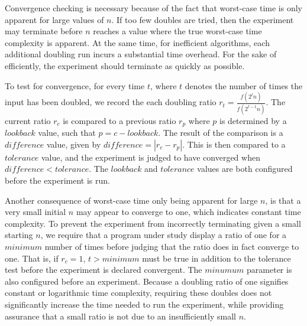   Convergence checking is necessary because of the fact that worst-case time is only apparent for large values of $n$.
  If too few doubles are tried, then the experiment may terminate before $n$ reaches a value where the true worst-case
  time complexity is apparent. At the same time, for inefficient  algorithms, each additional doubling run incurs a
  substantial time overhead. For the sake of efficiently, the experiment should terminate as quickly as possible.


  To test for convergence, for every time $t$, where $t$ denotes the number of times the input has been doubled, we
  record the each doubling ratio $r_t = \frac{f(2^t n)}{f(2^{t-1}n)}$. The current ratio $r_c$ is compared to a previous
  ratio $r_p$ where $p$ is determined by a $\mathit{lookback}$ value, such that $p=c-\mathit{lookback}$.  The result of
  the comparison is a $\mathit{difference}$ value, given by $\mathit{difference} = |r_c - r_p|$.  This is then compared
  to a $\mathit{tolerance}$ value, and the experiment is judged to have converged when $\mathit{difference}<\mathit{tolerance}$.
  The $\mathit{lookback}$ and $\mathit{tolerance}$ values are both configured before the experiment is run.

  Another consequence of worst-case time only being apparent for large $n$, is that a very small initial $n$ may appear
  to converge to one, which indicates constant time complexity. To prevent the experiment from incorrectly terminating given a
  small starting $n$, we require that a program under study display a ratio of one for a $\mathit{minimum}$ number of
  times before judging that the ratio does in fact converge to one.  That is, if $r_c = 1$, $t > \mathit{minimum}$ must
  be true in addition to the tolerance test before the experiment is declared convergent.  The $\mathit{minumum}$
  parameter is also configured before an experiment.  Because a doubling ratio of one signifies constant or logarithmic
  time complexity, requiring these doubles does not significantly increase the time needed to run the experiment, while
  providing assurance that a small ratio is not due to an insufficiently small $n$.
